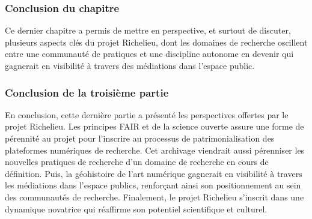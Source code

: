 \subsubsection{Conclusion du chapitre}
Ce dernier chapitre a permis de mettre en perspective, et surtout de discuter, plusieurs aspects clés du projet Richelieu, dont les domaines de recherche oscillent entre une communauté de pratiques et une discipline autonome en devenir qui gagnerait en visibilité à travers des médiations dans l'espace public. 

\subsubsection{Conclusion de la troisième partie}
En conclusion, cette dernière partie a présenté les perspectives offertes par le projet Richelieu. Les principes FAIR et de la science ouverte assure une forme de pérennité au projet pour l'inscrire au processus de patrimonialisation des plateformes numériques de recherche. Cet archivage viendrait aussi pérenniser les nouvelles pratiques de recherche d'un domaine de recherche en cours de définition. Puis, la géohistoire de l'art numérique gagnerait en visibilité à travers les médiations dans l'espace publics, renforçant ainsi son positionnement au sein des communautés de recherche. Finalement, le projet Richelieu s'inscrit dans une dynamique novatrice qui réaffirme son potentiel scientifique et culturel. 